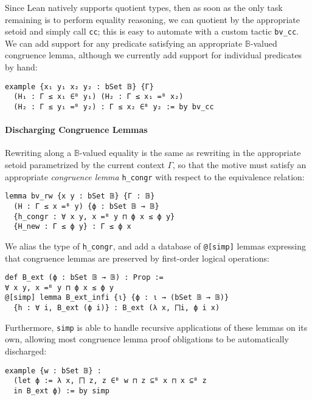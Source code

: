 \documentclass[sigplan,screen]{acmart}
\newcommand{\lil}{\lstinline}
\theoremstyle{definition}
\begin{document}
Since Lean natively supports quotient types, then as soon as the only task remaining is to perform equality reasoning,
we can quotient by the appropriate setoid and simply call \lil{cc};
this is easy to automate with a custom tactic \lil{bv_cc}. %
We can add support for any predicate satisfying an appropriate \(\mathbb{B}\)-valued congruence lemma,
although we currently add support for individual predicates by hand:
\begin{lstlisting}
example {x₁ y₁ x₂ y₂ : bSet 𝔹} {Γ}
  (H₁ : Γ ≤ x₁ ∈ᴮ y₁) (H₂ : Γ ≤ x₁ =ᴮ x₂)
  (H₂ : Γ ≤ y₁ =ᴮ y₂) : Γ ≤ x₂ ∈ᴮ y₂ := by bv_cc
\end{lstlisting}
\paragraph{Discharging Congruence Lemmas} \label{subsect:B-ext}
Rewriting along a \(\mathbb{B}\)-valued equality is the same as rewriting in the appropriate setoid parametrized by the current context \(\Gamma\), %
so that the motive must satisfy an appropriate \emph{congruence lemma} \lil{h_congr} with respect to the equivalence relation:
\begin{lstlisting}
lemma bv_rw {x y : bSet 𝔹} {Γ : 𝔹}
  (H : Γ ≤ x =ᴮ y) {ϕ : bSet 𝔹 → 𝔹}
  {h_congr : ∀ x y, x =ᴮ y ⊓ ϕ x ≤ ϕ y}
  {H_new : Γ ≤ ϕ y} : Γ ≤ ϕ x
\end{lstlisting}
We alias the type of \lil{h_congr}, and add a database of \lil{@[simp]} lemmas expressing that congruence lemmas are preserved by first-order logical operations:
\begin{lstlisting}
def B_ext (ϕ : bSet 𝔹 → 𝔹) : Prop :=
∀ x y, x =ᴮ y ⊓ ϕ x ≤ ϕ y
@[simp] lemma B_ext_infi {ι} {ϕ : ι → (bSet 𝔹 → 𝔹)}
  {h : ∀ i, B_ext (ϕ i)} : B_ext (λ x, ⨅i, ϕ i x)
\end{lstlisting}
Furthermore, \lil{simp} is able to handle recursive applications of these lemmas on its own, allowing most congruence lemma proof obligations to be automatically discharged:
\begin{lstlisting}
example {w : bSet 𝔹} :
  (let ϕ := λ x, ⨅ z, z ∈ᴮ w ⊓ z ⊆ᴮ x ⊓ x ⊆ᴮ z
  in B_ext ϕ) := by simp
\end{lstlisting}
\end{document}
